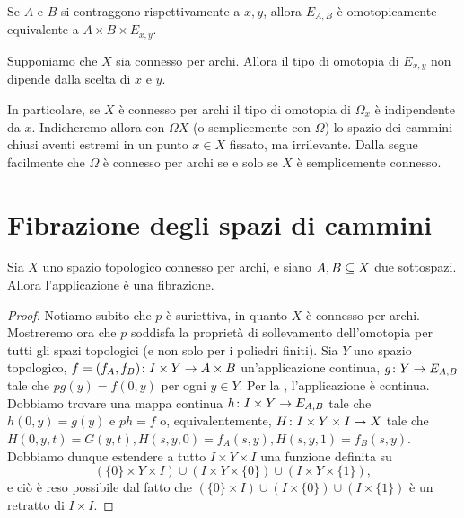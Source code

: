 \begin{corollary}
Se $A$ e $B$ si contraggono rispettivamente a $x,y$, allora $E_{A,B}$ è omotopicamente equivalente a $A\times B\times E_{x,y}$.
\end{corollary}
\begin{corollary}
Supponiamo che $X$ sia connesso per archi. Allora il tipo di omotopia di $E_{x,y}$ non dipende dalla scelta di $x$ e $y$.
\end{corollary}
In particolare, se $X$ è connesso per archi il tipo di omotopia di $\Omega_x$ è indipendente da $x$. Indicheremo allora con $\Omega X$ (o semplicemente con $\Omega$) lo spazio dei cammini chiusi aventi estremi in un punto $x\in X$ fissato, ma irrilevante. Dalla  segue facilmente che $\Omega$ è connesso per archi se e solo se $X$ è semplicemente connesso.

\section{Fibrazione degli spazi di cammini}
\begin{proposition}
Sia $X$ uno spazio topologico connesso per archi, e siano $A,B\subseteq X$ due sottospazi. Allora l'applicazione
è una fibrazione.
\end{proposition}
\begin{proof}
Notiamo subito che $p$ è suriettiva, in quanto $X$ è connesso per archi. Mostreremo ora che $p$ soddisfa la proprietà di sollevamento dell'omotopia per tutti gli spazi topologici (e non solo per i poliedri finiti). Sia $Y$ uno spazio topologico, $f=(f_A,f_B)\colon I\times Y\to A\times B$ un'applicazione continua, $g\colon Y\to E_{A,B}$ tale che $pg(y)=f(0,y)$ per ogni $y\in Y$. Per la , l'applicazione
è continua. Dobbiamo trovare una mappa continua $h\colon I\times Y\to E_{A,B}$ tale che $h(0,y)=g(y)$ e $ph=f$ o, equivalentemente, $H\colon I\times Y\times I\to X$ tale che $H(0,y,t)=G(y,t),H(s,y,0)=f_A(s,y),H(s,y,1)=f_B(s,y)$. Dobbiamo dunque estendere a tutto $I\times Y\times I$ una funzione definita su
$$
(\{0\}\times Y\times I)\cup(I\times Y\times \{0\})\cup(I\times Y\times \{1\}),
$$
e ciò è reso possibile dal fatto che $(\{0\}\times I)\cup(I\times\{0\})\cup(I\times\{1\})$ è un retratto di $I\times I$.
\end{proof}

